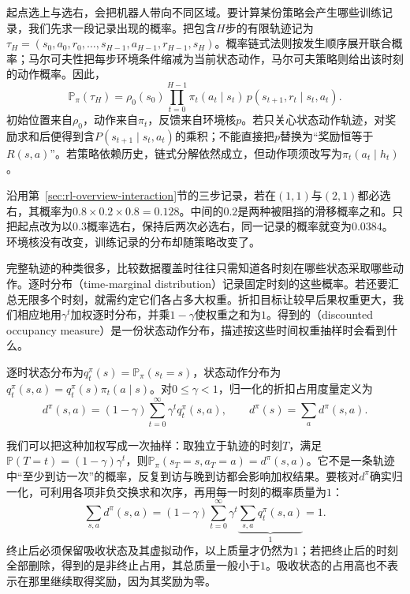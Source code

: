 起点选上与选右，会把机器人带向不同区域。要计算某份策略会产生哪些训练记录，我们先求一段记录出现的概率。把包含$H$步的有限轨迹记为$\tau_H=(s_0,a_0,r_0,\ldots,s_{H-1},a_{H-1},r_{H-1},s_H)$。概率链式法则按发生顺序展开联合概率；马尔可夫性把每步环境条件缩减为当前状态动作，马尔可夫策略则给出该时刻的动作概率。因此，
\begin{equation}
  \mathbb P_\pi(\tau_H)
  =\rho_0(s_0)\prod_{t=0}^{H-1}
    \pi_t(a_t\mid s_t)\,p(s_{t+1},r_t\mid s_t,a_t).
  \label{eq:rl-overview-trajectory}
\end{equation}
初始位置来自$\rho_0$，动作来自$\pi_t$，反馈来自环境核$p$。若只关心状态动作轨迹，对奖励求和后便得到含$P(s_{t+1}\mid s_t,a_t)$的乘积；不能直接把$p$替换为“奖励恒等于$R(s,a)$”。若策略依赖历史，链式分解依然成立，但动作项须改写为$\pi_t(a_t\mid h_t)$。

沿用第~\ref{sec:rl-overview-interaction}节的三步记录，若在$(1,1)$与$(2,1)$都必选右，其概率为$0.8\times0.2\times0.8=0.128$。中间的$0.2$是两种被阻挡的滑移概率之和。只把起点改为以$0.3$概率选右，保持后两次必选右，同一记录的概率就变为$0.0384$。环境核没有改变，训练记录的分布却随策略改变了。

完整轨迹的种类很多，比较数据覆盖时往往只需知道各时刻在哪些状态采取哪些动作。逐时分布（time-marginal distribution）记录固定时刻的这些概率。若还要汇总无限多个时刻，就需约定它们各占多大权重。折扣目标让较早后果权重更大，我们相应地用$\gamma^t$加权逐时分布，并乘$1-\gamma$使权重之和为$1$。得到的（discounted occupancy measure）是一份状态动作分布，描述按这些时间权重抽样时会看到什么。

\begin{definition}[逐时分布与折扣占用度量]
  \label{def:rl-overview-occupancy}
  逐时状态分布为$q_t^\pi(s)=\mathbb P_\pi(s_t=s)$，状态动作分布为$q_t^\pi(s,a)=q_t^\pi(s)\pi_t(a\mid s)$。对$0\leq\gamma<1$，归一化的折扣占用度量定义为
  \begin{equation}
    d^\pi(s,a)=(1-\gamma)\sum_{t=0}^{\infty}
      \gamma^t q_t^\pi(s,a),\qquad
    d^\pi(s)=\sum_a d^\pi(s,a).
    \label{eq:rl-overview-occupancy}
  \end{equation}
\end{definition}

我们可以把这种加权写成一次抽样：取独立于轨迹的时刻$T$，满足$\mathbb P(T=t)=(1-\gamma)\gamma^t$，则$\mathbb P_\pi(s_T=s,a_T=a)=d^\pi(s,a)$。它不是一条轨迹中“至少到访一次”的概率，反复到访与晚到访都会影响加权结果。要核对$d^\pi$确实归一化，可利用各项非负交换求和次序，再用每一时刻的概率质量为$1$：
\[
  \sum_{s,a}d^\pi(s,a)
  =(1-\gamma)\sum_{t=0}^{\infty}\gamma^t
    \underbrace{\sum_{s,a}q_t^\pi(s,a)}_{1}=1.
\]
终止后必须保留吸收状态及其虚拟动作，以上质量才仍然为$1$；若把终止后的时刻全部删除，得到的是非终止占用，其总质量一般小于$1$。吸收状态的占用高也不表示在那里继续取得奖励，因为其奖励为零。


